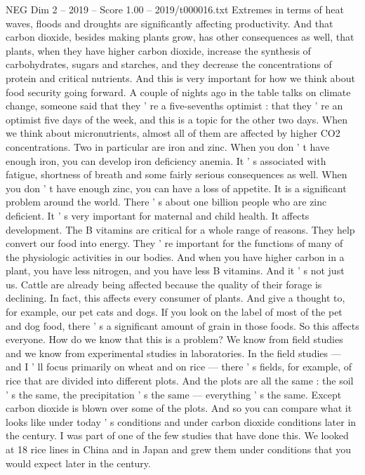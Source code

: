 \begin{textsample}{NEG Dim 2 – 2019 – Score 1.00 – 2019/t000016.txt}
Extremes in terms of heat waves, floods and droughts are significantly affecting productivity.
And that carbon dioxide, besides making plants grow, has other consequences as well, that plants, when they have higher carbon dioxide, increase the synthesis of carbohydrates, sugars and starches, and they decrease the concentrations of protein and critical nutrients.
And this is very important for how we think about food security going forward.
A couple of nights ago in the table talks on climate change, someone said that they ' re a five-sevenths optimist : that they ' re an optimist five days of the week, and this is a topic for the other two days.
When we think about micronutrients, almost all of them are affected by higher CO2 concentrations.
Two in particular are iron and zinc.
When you don ' t have enough iron, you can develop iron deficiency anemia.
It ' s associated with fatigue, shortness of breath and some fairly serious consequences as well.
When you don ' t have enough zinc, you can have a loss of appetite.
It is a significant problem around the world.
There ' s about one billion people who are zinc deficient.
It ' s very important for maternal and child health.
It affects development.
The B vitamins are critical for a whole range of reasons.
They help convert our food into energy.
They ' re important for the functions of many of the physiologic activities in our bodies.
And when you have higher carbon in a plant, you have less nitrogen, and you have less B vitamins.
And it ' s not just us.
Cattle are already being affected because the quality of their forage is declining.
In fact, this affects every consumer of plants.
And give a thought to, for example, our pet cats and dogs.
If you look on the label of most of the pet and dog food, there ' s a significant amount of grain in those foods.
So this affects everyone.
How do we know that this is a problem?
We know from field studies and we know from experimental studies in laboratories.
In the field studies — and I ' ll focus primarily on wheat and on rice — there ' s fields, for example, of rice that are divided into different plots.
And the plots are all the same : the soil ' s the same, the precipitation ' s the same — everything ' s the same.
Except carbon dioxide is blown over some of the plots.
And so you can compare what it looks like under today ' s conditions and under carbon dioxide conditions later in the century.
I was part of one of the few studies that have done this.
We looked at 18 rice lines in China and in Japan and grew them under conditions that you would expect later in the century.

\end{textsample}
